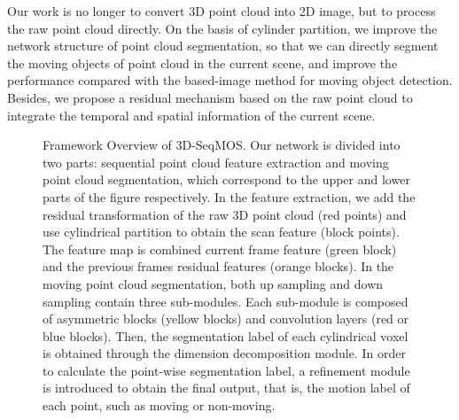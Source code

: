 \documentclass[lettersize,journal]{IEEEtran}
\begin{document}
Our work is no longer to convert 3D point cloud into 2D image, but to process the raw point cloud directly. On the basis of cylinder partition, we improve the network structure of point cloud segmentation, so that we can directly segment the moving objects of point cloud in the current scene, and improve the performance compared with the based-image method for moving object detection. Besides, we propose a residual mechanism based on the raw point cloud to integrate the temporal and spatial information of the current scene.


\begin{figure}[t]
\centering
\vskip 0.2in

\caption{Framework Overview of 3D-SeqMOS. Our network is divided into two parts: sequential point cloud feature extraction and moving point cloud segmentation, which correspond to the upper and lower parts of the figure respectively. In the feature extraction, we add the residual transformation of the raw 3D point cloud (red points) and use cylindrical partition to obtain the scan feature (block points). The feature map is combined current frame feature (green block) and the previous frames residual features (orange blocks). In the moving point cloud segmentation, both up sampling and down sampling contain three sub-modules. Each sub-module is composed of asymmetric blocks (yellow blocks) and convolution layers (red or blue blocks). Then, the segmentation label of each cylindrical voxel is obtained through the dimension decomposition module. In order to calculate the point-wise segmentation label, a refinement module is introduced to obtain the final output, that is, the motion label of each point, such as moving or non-moving.}
\label{fig2}
\end{figure}
\end{document}
